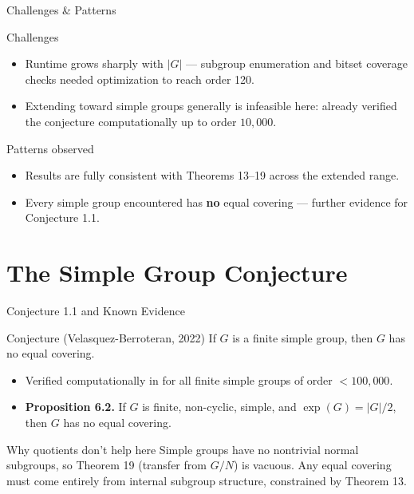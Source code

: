 \documentclass[9pt,aspectratio=169]{beamer}
\begin{document}
\begin{frame}{Challenges \& Patterns}
\begin{block}{Challenges}
\begin{itemize}
\item Runtime grows sharply with $|G|$ — subgroup enumeration and bitset coverage checks needed optimization to reach order 120.
\item Extending toward simple groups generally is infeasible here: \cite{vb} already verified the conjecture computationally up to order $10{,}000$.
\end{itemize}
\end{block}
\begin{exampleblock}{Patterns observed}
\begin{itemize}
\item Results are fully consistent with Theorems 13--19 across the extended range.
\item Every simple group encountered has \textbf{no} equal covering — further evidence for Conjecture 1.1.
\end{itemize}
\end{exampleblock}
\end{frame}

\section{The Simple Group Conjecture}

\begin{frame}{Conjecture 1.1 and Known Evidence}
\begin{block}{Conjecture (Velasquez-Berroteran, 2022)}
If $G$ is a finite simple group, then $G$ has no equal covering.
\end{block}
\begin{itemize}
\item Verified computationally in \cite{vb} for all finite simple groups of order $< 100{,}000$.
\item \textbf{Proposition 6.2.} If $G$ is finite, non-cyclic, simple, and $\exp(G) = |G|/2$, then $G$ has no equal covering.
\end{itemize}
\begin{alertblock}{Why quotients don't help here}
Simple groups have no nontrivial normal subgroups, so Theorem 19 (transfer from $G/N$) is vacuous. Any equal covering must come entirely from internal subgroup structure, constrained by Theorem 13.
\end{alertblock}
\end{frame}
\end{document}
